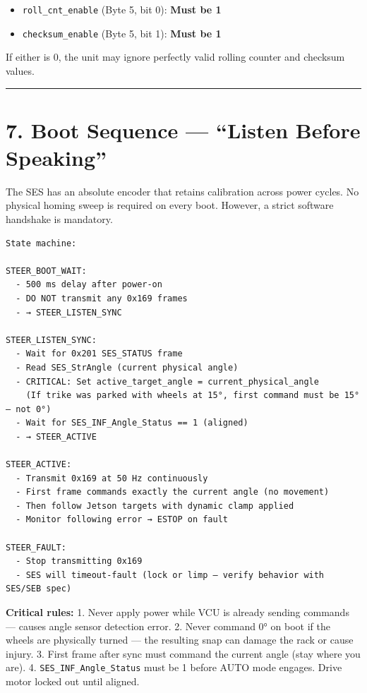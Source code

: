 \documentclass[12pt,a4paper,oneside]{report}
\providecommand{\tightlist}{\setlength{\itemsep}{0pt}\setlength{\parskip}{0pt}}
\begin{document}
\begin{itemize}
\tightlist
\item
  \texttt{roll\_cnt\_enable} (Byte 5, bit 0): \textbf{Must be 1}
\item
  \texttt{checksum\_enable} (Byte 5, bit 1): \textbf{Must be 1}
\end{itemize}

If either is 0, the unit may ignore perfectly valid rolling counter and checksum
values.

\begin{center}\rule{0.5\linewidth}{0.5pt}\end{center}

\section{7. Boot Sequence --- ``Listen Before
Speaking''}\label{boot-sequence-listen-before-speaking}

The SES has an absolute encoder that retains calibration across power cycles.
No physical homing sweep is required on every boot. However, a strict software
handshake is mandatory.

\begin{verbatim}
State machine:

STEER_BOOT_WAIT:
  - 500 ms delay after power-on
  - DO NOT transmit any 0x169 frames
  - → STEER_LISTEN_SYNC

STEER_LISTEN_SYNC:
  - Wait for 0x201 SES_STATUS frame
  - Read SES_StrAngle (current physical angle)
  - CRITICAL: Set active_target_angle = current_physical_angle
    (If trike was parked with wheels at 15°, first command must be 15° — not 0°)
  - Wait for SES_INF_Angle_Status == 1 (aligned)
  - → STEER_ACTIVE

STEER_ACTIVE:
  - Transmit 0x169 at 50 Hz continuously
  - First frame commands exactly the current angle (no movement)
  - Then follow Jetson targets with dynamic clamp applied
  - Monitor following error → ESTOP on fault

STEER_FAULT:
  - Stop transmitting 0x169
  - SES will timeout-fault (lock or limp — verify behavior with SES/SEB spec)
\end{verbatim}

\textbf{Critical rules:} 1. Never apply power while VCU is already sending
commands --- causes angle sensor detection error. 2. Never command 0° on boot if
the wheels are physically turned --- the resulting snap can damage the rack or
cause injury. 3. First frame after sync must command the current angle (stay
where you are). 4. \texttt{SES\_INF\_Angle\_Status} must be 1 before AUTO mode
engages. Drive motor locked out until aligned.
\end{document}
